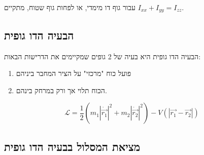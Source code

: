 \documentclass{tstextbook}
\begin{document}
\begin{theorem}
עבור גוף דו מימדי, או לפחות גוף שטוח, מתקיים \(I_{x x}+I_{yy}=I_{zz}\).

\end{theorem}
\subsection{הבעיה הדו גופית}

הבעיה הדו גופית היא בעיה של 2 גופים שמקיימים את הדרישות הבאות:

\begin{enumerate}
  \item פועל כוח "מרכזי" על הציר המחבר ביניהם 


  \item הכוח תלוי אך ורק במרחק בינהם. 


\end{enumerate}
\begin{proposition}
$$ \mathcal{L}=\frac12\left(m_1\left|\dot{\vec{r_1}}\right|^2+m_2\left|\dot{\vec{r_2}}\right|^2\right)-V\left(|\vec{r_1}-\vec{r_2}|\right)$$

\end{proposition}
\subsection{מציאת המסלול בבעיה הדו גופית}
\end{document}
